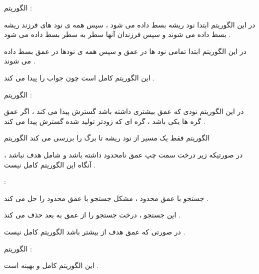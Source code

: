 \documentclass[12pt]{article}
\begin{document}
\begin{tcolorbox}
الگوریتم 
  : 
 
 در این الگوریتم ابتدا نود ریشه بسط داده می شود ، سپس همه ی نود های فرزند ریشه بسط داده می شوند و سپس فرزندان آنها سطر به سطر بسط داده می شود .
 
 در این الگوریتم ابتدا تمامی نود ها در عمق 
 و سپس همه ی نودها  در عمق
 بسط داده می شوند .
 
 این الگوریتم کامل است چون جواب را پیدا می کند .
 
 \vspace{20pt}
 
 الگوریتم
   : 
  
  در این الگوریتم نودی که عمق بیشتری داشته باشد گسترش پیدا می کند ، اگر عمق گره ها یکی باشد ، گره ای که زودتر تولید شده گسترش پیدا می کند .
  
  الگوریتم 
   فقط یک مسیر از نود ریشه تا برگ را بررسی می کند 
   الگوریتم
   
   
   در صورتیکه زیر درخت سمت چپ عمق نامحدود داشته باشد و شامل هدف نباشد ، آنگاه این الگوریتم کامل نیست .
   
   
   : 
  
  جستجو با عمق محدود ، مشکل جستجو با عمق محدود را حل می کند .
  
  این جستجو ، درخت جستجو را از عمق
  به بعد حذف می کند .
  
  در صورتی که عمق هدف از 
  بیشتر باشد الگوریتم کامل نیست .
  
  
   الگوریتم
   : 
  
  این الگوریتم کامل و بهینه است .

\end{tcolorbox}
\end{document}

